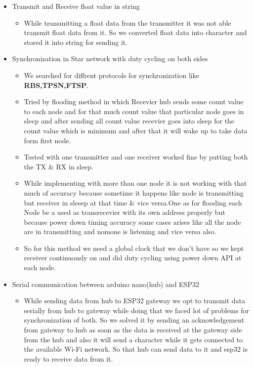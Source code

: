 \documentclass[a4paper,12pt,oneside]{book}
\begin{document}
\begin{itemize}
        \item Transmit and Receive float value in string 
        \begin{itemize}
        \item While transmitting a float data from the transmitter it was not able transmit float data from it. So we converted float data into character and stored it into string  for sending it.
        \end{itemize}
        \item Synchronization in Star network with duty cycling on both sides
        \begin{itemize}
        \item We searched for diffrent protocols for synchronization like \textbf{RBS,TPSN,FTSP}.
        \item Tried by flooding method in which Recevier hub sends some count value to each node and for that much count value that particular node goes in sleep and after sending all count value recevier goes into sleep for the count value which is minimum and after that it will wake up to take data form first node.
        \item Tested with one transmitter and one receiver worked fine by putting both the TX \& RX in sleep.
        \item While implementing with more than one node it is not working with that much of accuracy because sometime it happens like node is transmitting but receiver in sleeep at that time \& vice versa.One as for flooding each Node be a used as transrecevier with its own address properly but because power down timing accuracy some cases arises like all the node are in transmitting and nomone is listening and vice versa also.
        \item So for this method we need a global clock that we don't have so we kept receiver continuously on and did duty cycling using power down API at each node.
        \end{itemize}
        \item Serial communication between arduino nano(hub) and ESP32
        \begin{itemize}
        \item While sending data from hub to ESP32 gateway we opt to transmit data serially from hub to gateway while doing that we faced lot of problems  for synchronization of both. So we solved it by sending an acknowledgement from gateway to hub as soon as the data is received at the gateway side from the hub and also it will send a character while it gets connected to the available Wi-Fi network. So that hub can send data to it and esp32 is ready to receive data from it.

\end{itemize}
\end{itemize}
\end{document}
